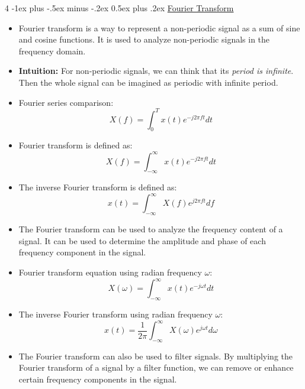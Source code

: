 \documentclass[10pt, landscape]{article}
\makeatletter
\renewcommand{\section}{\@startsection{section}{1}{0mm}%
  {-1ex plus -.5ex minus -.2ex}%
  {0.5ex plus .2ex}%
{\normalfont\large\bfseries}}
\makeatother
\begin{document}
\begin{multicols*}{4}
  \section{\underline{Fourier Transform}}
  \begin{itemize}
    \item Fourier transform is a way to represent a non-periodic signal as a sum of sine and cosine functions. It is used to analyze non-periodic signals in the frequency domain.
    \item \textbf{Intuition:} For non-periodic signals, we can think that its \textit{period is infinite}. Then the whole signal can be imagined as periodic with infinite period.
    \item Fourier series comparison:
    \begin{equation}
      X(f) = \int_{0}^{T} x(t) e^{-j 2 \pi f t} dt
    \end{equation}
    \item Fourier transform is defined as:
    \begin{equation}
      X(f) = \int_{-\infty}^{\infty} x(t) e^{-j 2 \pi f t} dt
    \end{equation}
    \item The inverse Fourier transform is defined as:
    \begin{equation}
      x(t) = \int_{-\infty}^{\infty} X(f) e^{j 2 \pi f t} df
    \end{equation}
    \item The Fourier transform can be used to analyze the frequency content of a signal. It can be used to determine the amplitude and phase of each frequency component in the signal.
    \item Fourier transform equation using radian frequency $\omega$:
    \begin{equation}
      X(\omega) = \int_{-\infty}^{\infty} x(t) e^{-j \omega t} dt
    \end{equation}
    \item The inverse Fourier transform using radian frequency $\omega$: 
    \begin{equation}
      x(t) = \frac{1}{2\pi} \int_{-\infty}^{\infty} X(\omega) e^{j \omega t} d\omega
    \end{equation}
    \item The Fourier transform can also be used to filter signals. By multiplying the Fourier transform of a signal by a filter function, we can remove or enhance certain frequency components in the signal.
    \end{itemize}


\end{multicols*}
\end{document}
